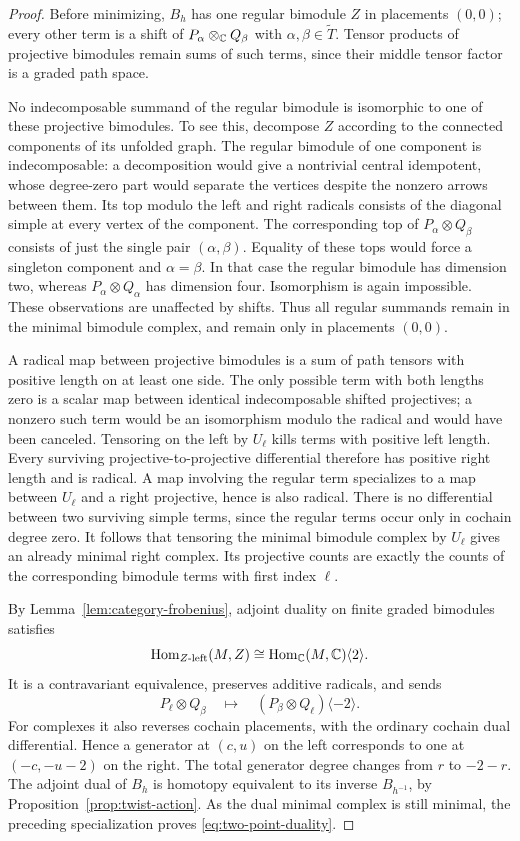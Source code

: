 \begin{proof}
Before minimizing, \(B_h\) has one regular bimodule \(Z\) in placements
\((0,0)\); every other term is a shift of
\(P_\alpha\otimes_{\mathbb C}Q_\beta\) with
\(\alpha,\beta\in\widetilde T\).  Tensor products of projective
bimodules remain sums of such terms, since their middle tensor factor
is a graded path space.

No indecomposable summand of the regular bimodule is isomorphic to one
of these projective bimodules.  To see this, decompose \(Z\) according
to the connected components of its unfolded graph.  The regular
bimodule of one component is indecomposable: a decomposition would
give a nontrivial central idempotent, whose degree-zero part would
separate the vertices despite the nonzero arrows between them.  Its
top modulo the left and right radicals consists of the diagonal
simple at every vertex of the component.  The corresponding top of
\(P_\alpha\otimes Q_\beta\) consists of just the single pair
\((\alpha,\beta)\).  Equality of these tops would force a singleton
component and \(\alpha=\beta\).  In that case the regular bimodule has
dimension two, whereas \(P_\alpha\otimes Q_\alpha\) has dimension
four.  Isomorphism is again impossible.  These observations are
unaffected by shifts.  Thus all regular summands remain in the
minimal bimodule complex, and remain only in placements \((0,0)\).

A radical map between projective bimodules is a sum of path tensors
with positive length on at least one side.  The only possible term
with both lengths zero is a scalar map between identical
indecomposable shifted projectives; a nonzero such term would be an
isomorphism modulo the radical and would have been canceled.
Tensoring on the left by \(U_\ell\) kills terms with positive left
length.  Every surviving projective-to-projective differential
therefore has positive right length and is radical.  A map involving
the regular term specializes to a map between \(U_\ell\) and a right
projective, hence is also radical.  There is no differential between
two surviving simple terms, since the regular terms occur only in
cochain degree zero.  It follows that tensoring the minimal bimodule
complex by \(U_\ell\) gives an already minimal right complex.  Its
projective counts are exactly the counts of the corresponding
bimodule terms with first index \(\ell\).

By Lemma~\ref{lem:category-frobenius}, adjoint duality on finite graded
bimodules satisfies
\[
 \operatorname{Hom}_{Z\text{-left}}(M,Z)
       \cong \operatorname{Hom}_\mathbb C(M,\mathbb C)\langle2\rangle.
\]
It is a contravariant equivalence, preserves additive radicals, and
sends
\[
 P_\ell\otimes Q_\beta
       \quad\longmapsto\quad
 (P_\beta\otimes Q_\ell)\langle-2\rangle.
\]
For complexes it also reverses cochain placements, with the ordinary
cochain dual differential.  Hence a generator at \((c,u)\) on the
left corresponds to one at \((-c,-u-2)\) on the right.  The total
generator degree changes from \(r\) to \(-2-r\).  The adjoint dual
of \(B_h\) is homotopy equivalent to its inverse \(B_{h^{-1}}\), by
Proposition~\ref{prop:twist-action}.  As the dual minimal complex is
still minimal, the preceding specialization proves
\eqref{eq:two-point-duality}.


\end{proof}
